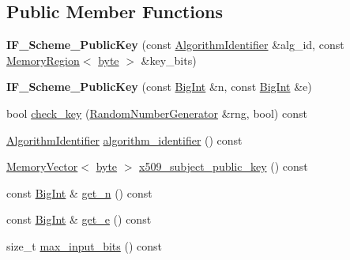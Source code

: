\subsection*{Public Member Functions}
\begin{DoxyCompactItemize}
\item 
\hypertarget{classBotan_1_1IF__Scheme__PublicKey_adc80512636174f8ae70ecb5231363439}{{\bfseries I\-F\-\_\-\-Scheme\-\_\-\-Public\-Key} (const \hyperlink{classBotan_1_1AlgorithmIdentifier}{Algorithm\-Identifier} \&alg\-\_\-id, const \hyperlink{classBotan_1_1MemoryRegion}{Memory\-Region}$<$ \hyperlink{namespaceBotan_a7d793989d801281df48c6b19616b8b84}{byte} $>$ \&key\-\_\-bits)}\label{classBotan_1_1IF__Scheme__PublicKey_adc80512636174f8ae70ecb5231363439}

\item 
\hypertarget{classBotan_1_1IF__Scheme__PublicKey_a4ab19efc2928bc18a3ea8f09a228ab2f}{{\bfseries I\-F\-\_\-\-Scheme\-\_\-\-Public\-Key} (const \hyperlink{classBotan_1_1BigInt}{Big\-Int} \&n, const \hyperlink{classBotan_1_1BigInt}{Big\-Int} \&e)}\label{classBotan_1_1IF__Scheme__PublicKey_a4ab19efc2928bc18a3ea8f09a228ab2f}

\item 
bool \hyperlink{classBotan_1_1IF__Scheme__PublicKey_aa2c7fa46d93cf3a1181a1ee93059abbd}{check\-\_\-key} (\hyperlink{classBotan_1_1RandomNumberGenerator}{Random\-Number\-Generator} \&rng, bool) const 
\item 
\hyperlink{classBotan_1_1AlgorithmIdentifier}{Algorithm\-Identifier} \hyperlink{classBotan_1_1IF__Scheme__PublicKey_ad946a7f62251823330387e5d4aa6307d}{algorithm\-\_\-identifier} () const 
\item 
\hyperlink{classBotan_1_1MemoryVector}{Memory\-Vector}$<$ \hyperlink{namespaceBotan_a7d793989d801281df48c6b19616b8b84}{byte} $>$ \hyperlink{classBotan_1_1IF__Scheme__PublicKey_a46594f29ffb99987b55b692c2aced59b}{x509\-\_\-subject\-\_\-public\-\_\-key} () const 
\item 
const \hyperlink{classBotan_1_1BigInt}{Big\-Int} \& \hyperlink{classBotan_1_1IF__Scheme__PublicKey_aa596f36ca0d57bc525ed2011e03f3b3a}{get\-\_\-n} () const 
\item 
const \hyperlink{classBotan_1_1BigInt}{Big\-Int} \& \hyperlink{classBotan_1_1IF__Scheme__PublicKey_a6cb95e72740e0f56197e63cd56f5a573}{get\-\_\-e} () const 
\item 
size\-\_\-t \hyperlink{classBotan_1_1IF__Scheme__PublicKey_addc9fb8592a0abd548bfd818c4bb165d}{max\-\_\-input\-\_\-bits} () const 
\end{DoxyCompactItemize}
